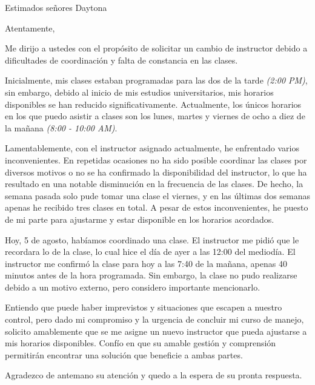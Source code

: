 \documentclass[11pt, letterpaper, roman]{moderncv}
\begin{document}
\date{Agosto 5, 2024}
\opening{Estimados señores Daytona}
\closing{Atentamente,}

\makelettertitle{}

Me dirijo a ustedes con el propósito de solicitar un cambio de instructor
debido a dificultades de coordinación y falta de constancia en las clases.

Inicialmente, mis clases estaban programadas para las dos de la tarde
\textit{(2:00 PM)}, sin embargo, debido al inicio de mis estudios
universitarios, mis horarios disponibles se han reducido significativamente.
Actualmente, los únicos horarios en los que puedo asistir a clases son los
lunes, martes y viernes de ocho a diez de la mañana \textit{(8:00 -{} 10:00
AM)}.

Lamentablemente, con el instructor asignado actualmente, he enfrentado varios
inconvenientes. En repetidas ocasiones no ha sido posible coordinar las clases
por diversos motivos o no se ha confirmado la disponibilidad del instructor, lo
que ha resultado en una notable disminución en la frecuencia de las clases. De
hecho, la semana pasada solo pude tomar una clase el viernes, y en las últimas
dos semanas apenas he recibido tres clases en total. A pesar de estos
inconvenientes, he puesto de mi parte para ajustarme y estar disponible en los
horarios acordados.

Hoy, 5 de agosto, habíamos coordinado una clase. El instructor me pidió que le
recordara lo de la clase, lo cual hice el día de ayer a las 12:00 del mediodía.
El instructor me confirmó la clase para hoy a las 7:40 de la mañana, apenas 40
minutos antes de la hora programada. Sin embargo, la clase no pudo realizarse
debido a un motivo externo, pero considero importante mencionarlo.

Entiendo que puede haber imprevistos y situaciones que escapen a nuestro
control, pero dado mi compromiso y la urgencia de concluir mi curso de manejo,
solicito amablemente que se me asigne un nuevo instructor que pueda ajustarse a
mis horarios disponibles. Confío en que su amable gestión y comprensión
permitirán encontrar una solución que beneficie a ambas partes.

Agradezco de antemano su atención y quedo a la espera de su pronta respuesta.

\makeletterclosing{}
\end{document}
